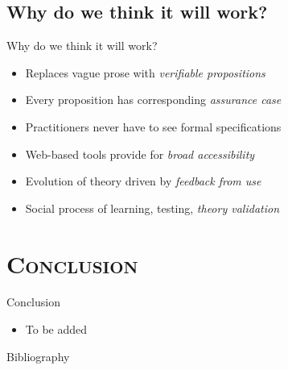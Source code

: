 \documentclass[xcolor=x11names,compress]{beamer}
\renewcommand{\(}{\begin{columns}}
\renewcommand{\)}{\end{columns}}
\newcommand{\<}[1]{\begin{column}{#1}}
\renewcommand{\>}{\end{column}}
\begin{document}

\subsection{Why do we think it will work?}
\begin{frame}{Why do we think it will work?}
\begin{itemize}
\item Replaces vague prose with {\em verifiable propositions}
\item Every proposition has corresponding {\em assurance case}
\item Practitioners never have to see formal specifications
\item Web-based tools provide for {\em broad accessibility}
\item Evolution of theory driven by {\em feedback from use}
\item Social process of learning, testing, {\em theory validation}
\end{itemize}
\end{frame}

\section{\scshape Conclusion}
\begin{frame}{Conclusion}
\begin{itemize}
\item To be added
\end{itemize}
\end{frame}

\begin{frame}{Bibliography}


\end{frame}
%
\end{document}
